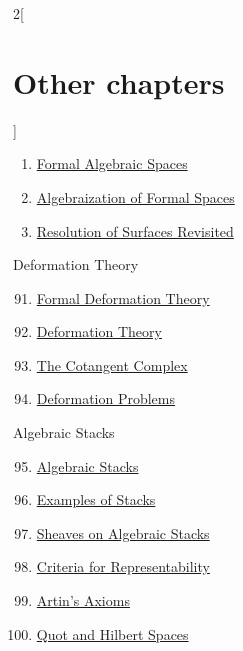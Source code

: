 \begin{multicols}{2}[\section{Other chapters}]
\begin{enumerate}
\item \href{https://github.com/stacks/stacks-project/blob/a04446e57ec1fbc252a871afcec7752fb2807b14/formal-spaces.tex}{Formal Algebraic Spaces}
\item \href{https://github.com/stacks/stacks-project/blob/a04446e57ec1fbc252a871afcec7752fb2807b14/restricted.tex}{Algebraization of Formal Spaces}
\item \href{https://github.com/stacks/stacks-project/blob/a04446e57ec1fbc252a871afcec7752fb2807b14/spaces-resolve.tex}{Resolution of Surfaces Revisited}
\end{enumerate}
Deformation Theory
\begin{enumerate}
\setcounter{enumi}{90}
\item \href{https://github.com/stacks/stacks-project/blob/a04446e57ec1fbc252a871afcec7752fb2807b14/formal-defos.tex}{Formal Deformation Theory}
\item \href{https://github.com/stacks/stacks-project/blob/a04446e57ec1fbc252a871afcec7752fb2807b14/defos.tex}{Deformation Theory}
\item \href{https://github.com/stacks/stacks-project/blob/a04446e57ec1fbc252a871afcec7752fb2807b14/cotangent.tex}{The Cotangent Complex}
\item \href{https://github.com/stacks/stacks-project/blob/a04446e57ec1fbc252a871afcec7752fb2807b14/examples-defos.tex}{Deformation Problems}
\end{enumerate}
Algebraic Stacks
\begin{enumerate}
\setcounter{enumi}{94}
\item \href{https://github.com/stacks/stacks-project/blob/a04446e57ec1fbc252a871afcec7752fb2807b14/algebraic.tex}{Algebraic Stacks}
\item \href{https://github.com/stacks/stacks-project/blob/a04446e57ec1fbc252a871afcec7752fb2807b14/examples-stacks.tex}{Examples of Stacks}
\item \href{https://github.com/stacks/stacks-project/blob/a04446e57ec1fbc252a871afcec7752fb2807b14/stacks-sheaves.tex}{Sheaves on Algebraic Stacks}
\item \href{https://github.com/stacks/stacks-project/blob/a04446e57ec1fbc252a871afcec7752fb2807b14/criteria.tex}{Criteria for Representability}
\item \href{https://github.com/stacks/stacks-project/blob/a04446e57ec1fbc252a871afcec7752fb2807b14/artin.tex}{Artin's Axioms}
\item \href{https://github.com/stacks/stacks-project/blob/a04446e57ec1fbc252a871afcec7752fb2807b14/quot.tex}{Quot and Hilbert Spaces}

\end{enumerate}
\end{multicols}
